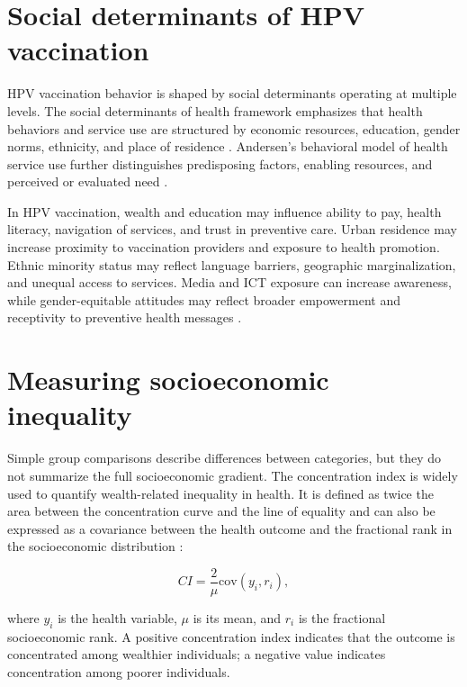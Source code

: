 \section{Social determinants of HPV vaccination}

HPV vaccination behavior is shaped by social determinants operating at multiple levels. The social determinants of health framework emphasizes that health behaviors and service use are structured by economic resources, education, gender norms, ethnicity, and place of residence \cite{commission2008}. Andersen's behavioral model of health service use further distinguishes predisposing factors, enabling resources, and perceived or evaluated need \cite{andersen1995}.

In HPV vaccination, wealth and education may influence ability to pay, health literacy, navigation of services, and trust in preventive care. Urban residence may increase proximity to vaccination providers and exposure to health promotion. Ethnic minority status may reflect language barriers, geographic marginalization, and unequal access to services. Media and ICT exposure can increase awareness, while gender-equitable attitudes may reflect broader empowerment and receptivity to preventive health messages \cite{nutbeam2008,wakefield2010,penchansky1981}.

\section{Measuring socioeconomic inequality}

Simple group comparisons describe differences between categories, but they do not summarize the full socioeconomic gradient. The concentration index is widely used to quantify wealth-related inequality in health. It is defined as twice the area between the concentration curve and the line of equality and can also be expressed as a covariance between the health outcome and the fractional rank in the socioeconomic distribution \cite{wagstaff1991,odonnell2008}:

\begin{equation}
CI = \frac{2}{\mu}\mathrm{cov}(y_i, r_i),
\end{equation}

\noindent where $y_i$ is the health variable, $\mu$ is its mean, and $r_i$ is the fractional socioeconomic rank. A positive concentration index indicates that the outcome is concentrated among wealthier individuals; a negative value indicates concentration among poorer individuals.

